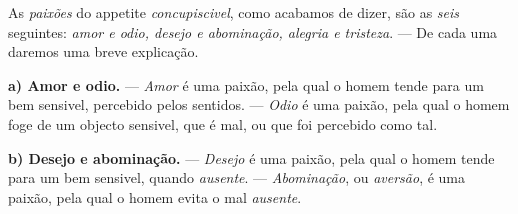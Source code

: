 
 
As \emph{paixões} do appetite \emph{concupiscivel}, como acabamos de dizer, são as \emph{seis} seguintes: \emph{amor e odio, desejo e abominação, alegria e tristeza}. --- De cada uma daremos uma breve explicação.

\textbf{a) Amor e odio.} --- \emph{Amor} é uma paixão, pela qual o homem tende para um bem sensivel, percebido pelos sentidos. --- \emph{Odio} é uma paixão, pela qual o homem foge de um objecto sensivel, que é mal, ou que foi percebido como tal.

\textbf{b) Desejo e abominação.} --- \emph{Desejo} é uma paixão, pela qual o homem tende para um bem sensivel, quando \emph{ausente}. --- \emph{Abominação}, ou \emph{aversão}, é uma paixão, pela qual o homem evita o mal \emph{ausente}.

